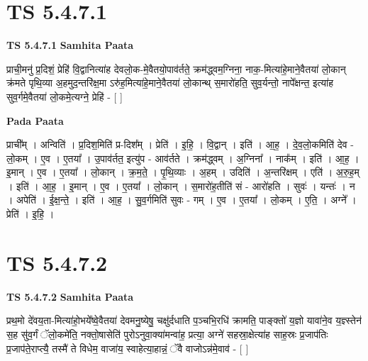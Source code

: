 \documentclass[17pt]{extarticle}
\begin{document}

\section{ TS 5.4.7.1 }

\textbf{TS 5.4.7.1 } \newline
\textbf{Samhita Paata} \newline

प्राची॒मनु॑ प्र॒दिशं॒ प्रेहि॑ वि॒द्वानित्या॑ह देवलो॒क-मे॒वैतयो॒पाव॑र्तते॒ क्रम॑द्ध्वम॒ग्निना॒ नाक॒-मित्या॑हे॒माने॒वैतया॑ लो॒कान् क्र॑मते पृथि॒व्या अ॒हमुद॒न्तरि॑क्ष॒मा ऽरु॑ह॒मित्या॑हे॒माने॒वैतया॑ लो॒कान्थ् स॒मारो॑हति॒ सुव॒र्यन्तो॒ नापे᳚क्षन्त॒ इत्या॑ह सुव॒र्गमे॒वैतया॑ लो॒कमे॒त्यग्ने॒ प्रेहि॑ - [  ] \newline

\textbf{Pada Paata} \newline

प्राची᳚म् । अन्विति॑ । प्र॒दिश॒मिति॑ प्र-दिश᳚म् । प्रेति॑ । इ॒हि॒ । वि॒द्वान् । इति॑ । आ॒ह॒ । दे॒व॒लो॒कमिति॑ देव - लो॒कम् । ए॒व । ए॒तया᳚ । उ॒पाव॑र्तत॒ इत्यु॑प - आव॑र्तते । क्रम॑द्ध्वम् । अ॒ग्निना᳚ । नाक᳚म् । इति॑ । आ॒ह॒ । इ॒मान् । ए॒व । ए॒तया᳚ । लो॒कान् । क्र॒म॒ते॒ । पृ॒थि॒व्याः । अ॒हम् । उदिति॑ । अ॒न्तरि॑क्षम् । एति॑ । अ॒रु॒ह॒म् । इति॑ । आ॒ह॒ । इ॒मान् । ए॒व । ए॒तया᳚ । लो॒कान् । स॒मारो॑ह॒तीति॑ सं - आरो॑हति । सुवः॑ । यन्तः॑ । न । अपेति॑ । ई॒क्ष॒न्ते॒ । इति॑ । आ॒ह॒ । सु॒व॒र्गमिति॑ सुवः - गम् । ए॒व । ए॒तया᳚ । लो॒कम् । ए॒ति॒ । अग्ने᳚ । प्रेति॑ । इ॒हि॒ ।  \newline





\section{ TS 5.4.7.2 }

\textbf{TS 5.4.7.2 } \newline
\textbf{Samhita Paata} \newline

प्रथ॒मो दे॑वय॒ता-मित्या॑हो॒भये᳚ष्वे॒वैतया॑ देवमनु॒ष्येषु॒ चक्षु॑र्दधाति प॒ञ्चभि॒रधि॑ क्रामति॒ पाङ्क्तो॑ य॒ज्ञो यावा॑ने॒व य॒ज्ञ्स्तेन॑ स॒ह सु॑व॒र्गं ॅलो॒कमे॑ति॒ नक्तो॒षासेति॑ पुरोऽनुवा॒क्या॑मन्वा॑ह॒ प्रत्या॒ अग्ने॑ सहस्रा॒क्षेत्या॑ह साह॒स्रः प्र॒जाप॑तिः प्र॒जाप॑ते॒राप्त्यै॒ तस्मै॑ ते विधेम॒ वाजा॑य॒ स्वाहेत्या॒हान्नं॒ ॅवै वाजोऽन्न॑मे॒वाव॑ - [  ] \newline
\end{document}
